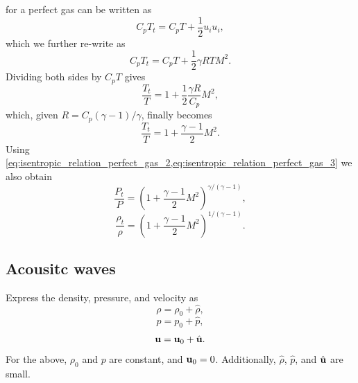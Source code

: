\documentclass[oneside,a4paper,11pt]{report}
\begin{document}
 for a perfect gas can be written as
\begin{equation}
    C_p T_t = C_p T + \frac{1}{2} u_i u_i,
\end{equation}
which we further re-write as
\begin{equation}
    C_p T_t = C_p T + \frac{1}{2} \gamma R T M^2.
\end{equation}
Dividing both sides by $C_pT$ gives
\begin{equation}
    \frac{T_t}{T} = 1 + \frac{1}{2} \frac{\gamma R}{C_p} M^2,
\end{equation}
which, given $R = C_p (\gamma -1)/\gamma$, finally becomes
\begin{equation}
\label{eq:stagnation_temperature}
    \frac{T_t}{T} = 1 + \frac{\gamma - 1}{2} M^2.
\end{equation}
Using \cref{eq:isentropic_relation_perfect_gas_2,eq:isentropic_relation_perfect_gas_3} we also obtain
\begin{equation}
\label{eq:stagnation_pressure}
    \frac{P_t}{P} = \left ( 1 + \frac{\gamma -1}{2} M^2 \right)^{\gamma / (\gamma - 1)},
\end{equation}
\begin{equation}
\label{eq:stagnation_density}
    \frac{\rho_t}{\rho} = \left ( 1 + \frac{\gamma -1}{2} M^2 \right)^{1 / (\gamma - 1)}.
\end{equation}

\subsection{Acousitc waves}

Express the density, pressure, and velocity as 
\begin{equation}
    \rho = \rho_0 + \hat{\rho},
\end{equation}
\begin{equation}
    p = p_0 + \hat{p},
\end{equation}
\begin{equation}
    \mathbf{u} = \mathbf{u}_0 + \hat{\mathbf{u}}.
\end{equation}
For the above, $\rho_0$ and $p$ are constant, and $\mathbf{u}_0 = 0$. Additionally, $\hat{\rho}$, $\hat{p}$, and $\hat{\mathbf{u}}$ are small.
\end{document}
